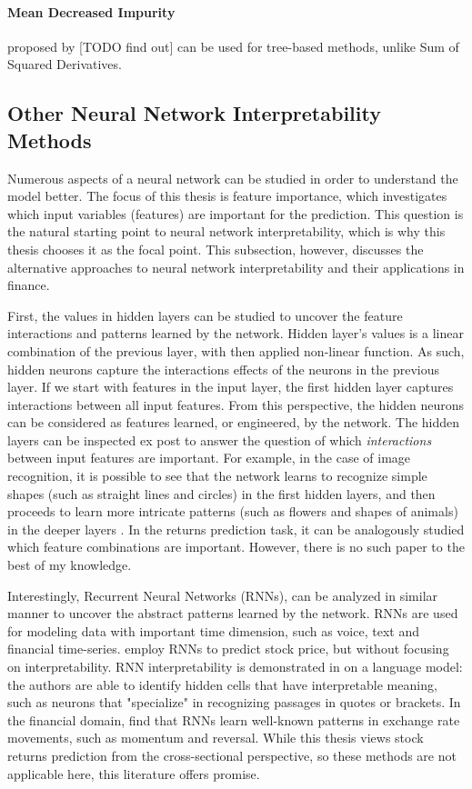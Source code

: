 			\paragraph{Mean Decreased Impurity} proposed by [TODO find out] can be used for tree-based methods, unlike Sum of Squared Derivatives.  
			
		
		\subsection{Other Neural Network Interpretability Methods}
			Numerous aspects of a neural network can be studied in order to understand the model better. The focus of this thesis is feature importance, which investigates which input variables (features) are important for the prediction. This question is the natural starting point to neural network interpretability, which is why this thesis chooses it as the focal point. This subsection, however, discusses the alternative approaches to neural network interpretability and their applications in finance. 
			
			First, the values in hidden layers can be studied to uncover the feature interactions and patterns learned by the network. Hidden layer's values is a linear combination of the previous layer, with then applied non-linear function. As such, hidden neurons capture the interactions effects of the neurons in the previous layer. If we start with features in the input layer, the first hidden layer captures interactions between all input features. From this perspective, the hidden neurons can be considered as features learned, or engineered, by the network. The hidden layers can be inspected ex post to answer the question of which \textit{interactions} between input features are important. For example, in the case of image recognition, it is possible to see that the network learns to recognize simple shapes (such as straight lines and circles) in the first hidden layers, and then proceeds to learn more intricate patterns (such as flowers and shapes of animals) in the deeper layers \citep{olah2017feature}. In the returns prediction task, it can be analogously studied which feature combinations are important. However, there is no such paper to the best of my knowledge. 
			
			Interestingly, Recurrent Neural Networks (RNNs), can be analyzed in similar manner to uncover the abstract patterns learned by the network. RNNs are used for modeling data with important time dimension, such as voice, text and financial time-series. \cite{di2016artificial} employ RNNs to predict stock price, but without focusing on interpretability. RNN interpretability is demonstrated in \cite{karpathy2015visualizing} on a language model: the authors are able to identify hidden cells that have interpretable meaning, such as neurons that "specialize" in recognizing passages in quotes or brackets. In the financial domain, \cite{giles1997rule} find that RNNs learn well-known patterns in exchange rate movements, such as momentum and reversal. While this thesis views stock returns prediction from the cross-sectional perspective, so these methods are not applicable here, this literature offers promise.  
			
